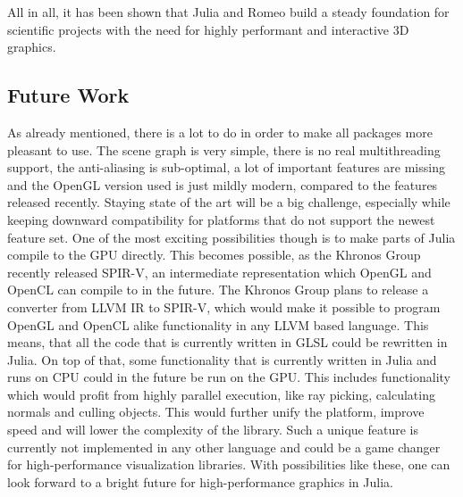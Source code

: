 All in all, it has been shown that Julia and Romeo build a steady foundation for scientific projects with the need for highly performant and interactive 3D graphics.

\subsection{Future Work}

As already mentioned, there is a lot to do in order to make all packages more pleasant to use.
The scene graph is very simple, there is no real multithreading support, the anti-aliasing is sub-optimal, a lot of important features are missing and the OpenGL version used is just mildly modern, compared to the features released recently. 
Staying state of the art will be a big challenge, especially while keeping downward compatibility for platforms that do not support the newest feature set.
One of the most exciting possibilities though is to make parts of Julia compile to the GPU directly. 
This becomes possible, as the Khronos Group recently released \ac{SPIR-V}, an intermediate representation which \ac{OpenGL} and \ac{OpenCL} can compile to in the future. The Khronos Group plans to release a converter from \ac{LLVM} \ac{IR} to \ac{SPIR-V}, which would make it possible to program \ac{OpenGL} and \ac{OpenCL} alike functionality in any \ac{LLVM} based language\cite{SpirV}.
This means, that all the code that is currently written in \ac{GLSL} could be rewritten in Julia. 
On top of that, some functionality that is currently written in Julia and runs on \ac{CPU} could in the future be run on the \ac{GPU}. This includes functionality which would profit from highly parallel execution, like ray picking, calculating normals and culling objects.
This would further unify the platform, improve speed and will lower the complexity of the library. 
Such a unique feature is currently not implemented in any other language and could be a game changer for high-performance visualization libraries.
With possibilities like these, one can look forward to a bright future for high-performance graphics in Julia.
